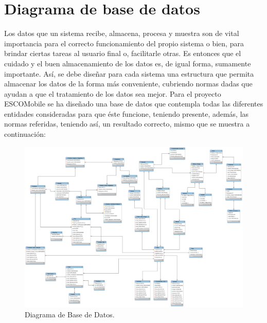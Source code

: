 \section{Diagrama de base de datos}

\noindent
Los datos que un sistema recibe, almacena, procesa y muestra son de vital importancia para el correcto funcionamiento del propio sistema o bien, para brindar ciertas tareas al usuario final o, facilitarle otras. Es entonces que el cuidado y el buen almacenamiento de los datos es, de igual forma, sumamente importante. Así, se debe diseñar para cada sistema una estructura que permita almacenar los datos de la forma más conveniente, cubriendo normas dadas que ayudan a que el tratamiento de los datos sea mejor. 
\newline
Para el proyecto ESCOMobile se ha diseñado una base de datos que contempla todas las diferentes entidades consideradas para que éste funcione, teniendo presente, además, las normas referidas, teniendo así, un resultado correcto, mismo que se muestra a continuación:

\begin{figure}[!htpb]
	\hypertarget{fig:baseDatos}{\hspace{1pt}}
	\begin{center}
		\includegraphics[width=1\textwidth]{images/clases/baseDatos}
		\caption{Diagrama de Base de Datos.}
		\label{fig:baseDatos}
	\end{center}
\end{figure}